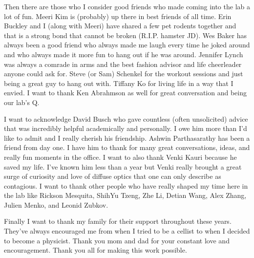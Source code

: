 Then there are those who I consider good friends who made coming into the lab a lot of fun. Meeri Kim is (probably) up there in best friends of all time. Erin Buckley and I (along with Meeri) have shared a few pet rodents together and that is a strong bond that cannot be broken (R.I.P. hamster JD). Wes Baker has always been a good friend who always made me laugh every time he joked around and who always made it more fun to hang out if he was around. Jennifer Lynch was always a comrade in arms and the best fashion advisor and life cheerleader anyone could ask for. Steve (or Sam) Schenkel for the workout sessions and just being a great guy to hang out with. Tiffany Ko for living life in a way that I envied. I want to thank Ken Abrahmson as well for great conversation and being our lab's Q.

I want to acknowledge David Busch who gave countless (often unsolicited) advice that was incredibly helpful academically and personally. I owe him more than I'd like to admit and I really cherish his friendship. Ashwin Parthasarathy has been a friend from day one. I have him to thank for many great conversations, ideas, and really fun moments in the office. I want to also thank Venki Kauri because he saved my life. I've known him less than a year but Venki really brought a great surge of curiosity and love of diffuse optics that one can only describe as contagious. I want to thank other people who have really shaped my time here in the lab like Rickson Mesquita, ShihYu Tzeng, Zhe Li, Detian Wang, Alex Zhang, Julien Menko, and Leonid Zubkov.

Finally I want to thank my family for their support throughout these years. They've always encouraged me from when I tried to be a cellist to when I decided to become a physicist. Thank you mom and dad for your constant love and encouragement. Thank you all for making this work possible.